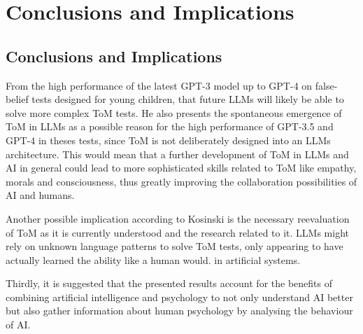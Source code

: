\section{Conclusions and Implications}
\subsection{Conclusions and Implications}
From the high performance of the latest GPT-3 model up to GPT-4 on false-belief tests designed for young children, that future LLMs will likely be able to solve more complex ToM tests. He also presents the spontaneous emergence of ToM in LLMs as a possible reason for the high performance of GPT-3.5 and GPT-4 in theses tests, since ToM is not deliberately designed into an LLMs architecture. This would mean that a further development of ToM in LLMs and AI in general could lead to more sophisticated skills related to ToM like empathy, morals and consciousness, thus greatly improving the collaboration possibilities of AI and humans. \cite{kosinski}

Another possible implication according to Kosinski is the necessary reevaluation of ToM as it is currently understood and the research related to it. LLMs might rely on unknown language patterns to solve ToM tests, only appearing to have actually learned the ability like a human would. in artificial systems.\cite{kosinski}

Thirdly, it is suggested that the presented results account for the benefits of combining artificial intelligence and psychology to not only understand AI better but also gather information about human psychology by analysing the behaviour of AI. \cite{kosinski}